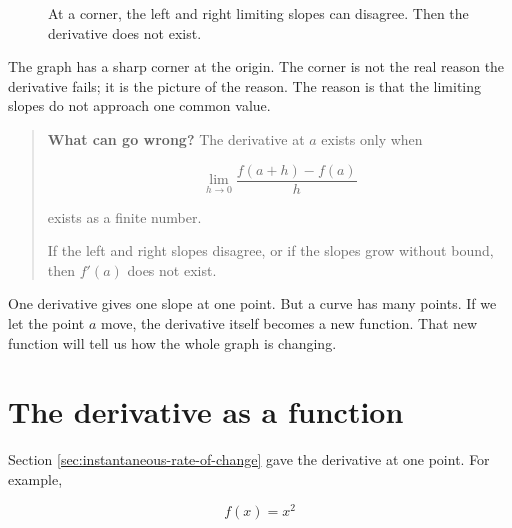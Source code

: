\begin{figure}[h]
\centering
{}
\caption{At a corner, the left and right limiting slopes can disagree.  Then the derivative does not exist.}
\label{fig:absolute-value-no-derivative}
\end{figure}

The graph has a sharp corner at the origin.  The corner is not the real reason the derivative fails; it is the picture of the reason.  The reason is that the limiting slopes do not approach one common value.

\begin{quote}
\textbf{What can go wrong?}
The derivative at \(a\) exists only when

\[
\lim_{h\to0}\frac{f(a+h)-f(a)}{h}
\]

exists as a finite number.

If the left and right slopes disagree, or if the slopes grow without bound, then \(f'(a)\) does not exist.
\end{quote}

One derivative gives one slope at one point.  But a curve has many points.  If we let the point \(a\) move, the derivative itself becomes a new function.  That new function will tell us how the whole graph is changing.
\section{The derivative as a function}
\label{sec:derivative-as-function}

Section \ref{sec:instantaneous-rate-of-change} gave the derivative at one point.  For example,

\[
f(x)=x^2
\]

